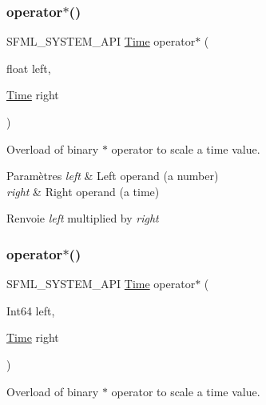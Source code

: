 \subsubsection{\texorpdfstring{operator$\ast$()}{operator*()}\hspace{0.1cm}{\footnotesize\ttfamily [3/4]}}
{\footnotesize\ttfamily S\+F\+M\+L\+\_\+\+S\+Y\+S\+T\+E\+M\+\_\+\+A\+PI \hyperlink{classsf_1_1Time}{Time} operator$\ast$ (\begin{DoxyParamCaption}\item[{float}]{left,  }\item[{\hyperlink{classsf_1_1Time}{Time}}]{right }\end{DoxyParamCaption})\hspace{0.3cm}{\ttfamily [related]}}



Overload of binary $\ast$ operator to scale a time value. 


\begin{DoxyParams}{Paramètres}
{\em left} & Left operand (a number) \\
\hline
{\em right} & Right operand (a time)\\
\hline
\end{DoxyParams}
\begin{DoxyReturn}{Renvoie}
{\itshape left} multiplied by {\itshape right} 
\end{DoxyReturn}
\mbox{\label{classsf_1_1Time_a40a6d0938fb4a43731d54fd90bfc6476}} 
\subsubsection{\texorpdfstring{operator$\ast$()}{operator*()}\hspace{0.1cm}{\footnotesize\ttfamily [4/4]}}
{\footnotesize\ttfamily S\+F\+M\+L\+\_\+\+S\+Y\+S\+T\+E\+M\+\_\+\+A\+PI \hyperlink{classsf_1_1Time}{Time} operator$\ast$ (\begin{DoxyParamCaption}\item[{Int64}]{left,  }\item[{\hyperlink{classsf_1_1Time}{Time}}]{right }\end{DoxyParamCaption})\hspace{0.3cm}{\ttfamily [related]}}



Overload of binary $\ast$ operator to scale a time value. 


